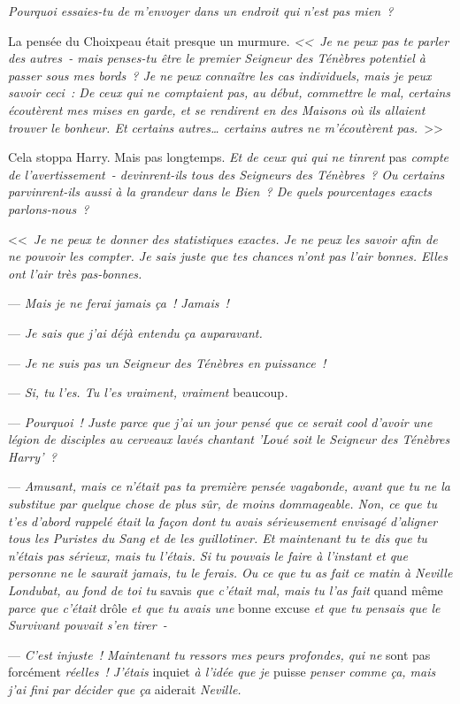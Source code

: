 \emph{Pourquoi essaies-tu de m'envoyer dans un endroit qui n'est pas mien~?}

La pensée du Choixpeau était presque un murmure. \emph{<<~Je ne peux pas te parler des autres~- mais penses-tu être le premier Seigneur des Ténèbres potentiel à passer sous mes bords~? Je ne peux connaître les cas individuels, mais je peux savoir ceci~: De ceux qui ne comptaient pas, au début, commettre le mal, certains écoutèrent mes mises en garde, et se rendirent en des Maisons où ils allaient trouver le bonheur. Et certains autres… certains autres ne m'écoutèrent pas.}~>>

Cela stoppa Harry. Mais pas longtemps. \emph{Et de ceux qui qui ne tinrent} pas \emph{compte de l'avertissement~- devinrent-ils tous des Seigneurs des Ténèbres~? Ou certains parvinrent-ils aussi à la grandeur dans le Bien~? De quels pourcentages exacts parlons-nous~?}

<<~\emph{Je ne peux te donner des statistiques exactes. Je ne peux les savoir afin de ne pouvoir les compter. Je sais juste que tes chances n'ont pas l'air bonnes. Elles ont l'air très pas-bonnes.}

--- \emph{Mais je ne ferai jamais ça~! Jamais~!}

--- \emph{Je sais que j'ai déjà entendu ça auparavant.}

--- \emph{Je ne suis pas un Seigneur des Ténèbres en puissance~!}

--- \emph{Si, tu l'es. Tu l'es vraiment, vraiment} beaucoup\emph{.}

--- \emph{Pourquoi~! Juste parce que j'ai un jour pensé que ce serait cool d'avoir une légion de disciples au cerveaux lavés chantant 'Loué soit le Seigneur des Ténèbres Harry'~?}

--- \emph{Amusant, mais ce n'était pas ta première pensée vagabonde, avant que tu ne la substitue par quelque chose de plus sûr, de moins dommageable. Non, ce que tu t'es d'abord rappelé était la façon dont tu avais sérieusement envisagé d'aligner tous les Puristes du Sang et de les guillotiner. Et maintenant tu te dis que tu n'étais pas sérieux, mais tu l'étais. Si tu pouvais le faire à l'instant et que personne ne le saurait jamais, tu le ferais. Ou ce que tu as fait ce matin à Neville Londubat, au fond de toi tu} savais \emph{que c'était mal, mais tu l'as fait} quand même \emph{parce que c'était} drôle \emph{et que tu avais une} bonne excuse \emph{et que tu pensais que le Survivant pouvait s'en tirer~-}

--- \emph{C'est injuste~! Maintenant tu ressors mes peurs profondes, qui ne} sont pas forcément \emph{réelles~! J'étais} inquiet \emph{à l'idée que je} puisse \emph{penser comme ça, mais j'ai fini par décider que ça} aiderait \emph{Neville.}

